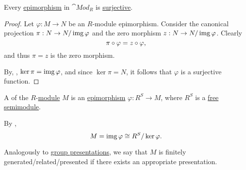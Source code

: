 \begin{proposition}\label{thm:module_epimorphisms_are_surjective}
  Every \hyperref[def:morphism_invertibility/right_cancellative]{epimorphism} in \hyperref[def:group/category]{\( \cat{Mod}_R \)} is \hyperref[def:function_invertibility/surjective]{surjective}.
\end{proposition}
\begin{proof}
  Let \( \varphi: M \to N \) be an \( R \)-module epimorphism. Consider the canonical projection \( \pi: N \to N / \operatorname{img} \varphi \) and the zero morphism \( z: N \to N / \operatorname{img} \varphi \). Clearly
  \begin{equation*}
    \pi \bincirc \varphi = z \bincirc \varphi,
  \end{equation*}
  and thus \( \pi = z \) is the zero morphism.

  By, , \( \ker \pi = \operatorname{img} \varphi \), and since \( \ker \pi = N \), it follows that \( \varphi \) is a surjective function.
\end{proof}

\begin{definition}\label{def:module_presentation}
  A  of the \( R \)-\hyperref[def:module]{module} \( M \) is an \hyperref[def:module/homomorphism]{epimorphism} \( \varphi: R^S \to M \), where \( R^S \) is a \hyperref[def:free_semimodule]{free semimodule}.

  By ,
  \begin{equation*}
    M = \operatorname{img} \varphi \cong R^S / \ker \varphi.
  \end{equation*}

  Analogously to \hyperref[def:group_presentation]{group presentations}, we say that \( M \) is finitely generated/related/presented if there exists an appropriate presentation.
\end{definition}

